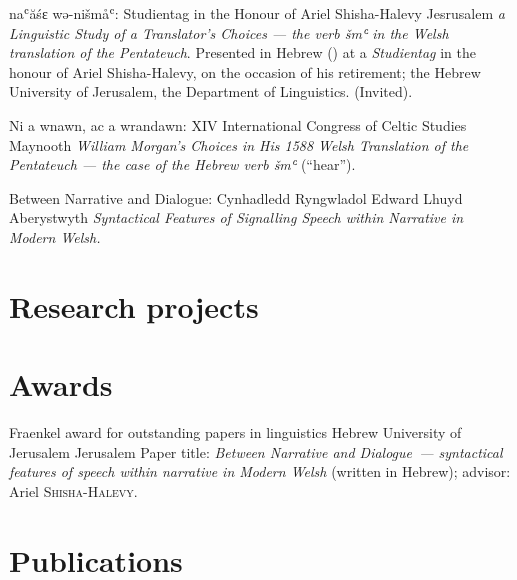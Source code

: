 	{na{ʿ}ăśɛ wə-nišmå{ʿ}:}
	{Studientag in the Honour of Ariel Shisha-Halevy}
	{Jesrusalem}
	{}
	{\emph{a Linguistic Study of a Translator’s Choices — the verb \emph{šm{ʿ}} in the Welsh translation of the Pentateuch}. Presented in Hebrew () at a \emph{Studientag} in the honour of Ariel Shisha-Halevy, on the occasion of his retirement; the Hebrew University of Jerusalem, the Department of Linguistics. (Invited).}

	{Ni a wnawn, ac a wrandawn:}
	{XIV International Congress of Celtic Studies}
	{Maynooth}
	{}
	{\emph{William Morgan’s Choices in His 1588 Welsh Translation of the Pentateuch — the case of the Hebrew verb \emph{šm{ʿ}}} (“hear”).}

	{Between Narrative and Dialogue:}
	{Cynhadledd Ryngwladol Edward Lhuyd}
	{Aberystwyth}
	{}
	{\emph{Syntactical Features of Signalling Speech within Narrative in Modern Welsh.}}



\section{Research projects}




\section{Awards}

	{Fraenkel award for outstanding papers in linguistics}
	{Hebrew University of Jerusalem}
	{Jerusalem}
	{}
	{Paper title: \emph{Between Narrative and Dialogue~— syntactical features of speech within narrative in Modern Welsh} (written in Hebrew); advisor: Ariel \textsc{Shisha-Halevy}.}



\section{Publications}

\nocite{*}
\printbibliography[keyword=text, heading=subbibliography, title={Editing, collecting, digitising and typesetting texts}]
\printbibliography[keyword=music, heading=subbibliography, title={Editing, collecting, digitising and engraving music}]



